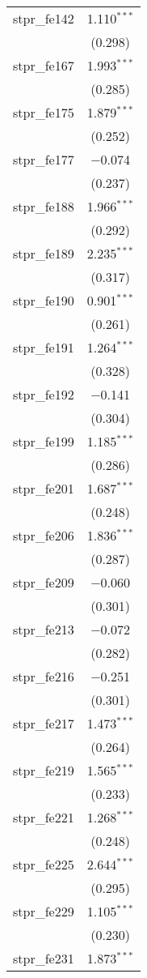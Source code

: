 \begin{table}[!htbp]
\begin{tabular}{@{\extracolsep{5pt}}lc}
  stpr\_fe142 & 1.110$^{***}$ \\ 
  & (0.298) \\ 
  stpr\_fe167 & 1.993$^{***}$ \\ 
  & (0.285) \\ 
  stpr\_fe175 & 1.879$^{***}$ \\ 
  & (0.252) \\ 
  stpr\_fe177 & $-$0.074 \\ 
  & (0.237) \\ 
  stpr\_fe188 & 1.966$^{***}$ \\ 
  & (0.292) \\ 
  stpr\_fe189 & 2.235$^{***}$ \\ 
  & (0.317) \\ 
  stpr\_fe190 & 0.901$^{***}$ \\ 
  & (0.261) \\ 
  stpr\_fe191 & 1.264$^{***}$ \\ 
  & (0.328) \\ 
  stpr\_fe192 & $-$0.141 \\ 
  & (0.304) \\ 
  stpr\_fe199 & 1.185$^{***}$ \\ 
  & (0.286) \\ 
  stpr\_fe201 & 1.687$^{***}$ \\ 
  & (0.248) \\ 
  stpr\_fe206 & 1.836$^{***}$ \\ 
  & (0.287) \\ 
  stpr\_fe209 & $-$0.060 \\ 
  & (0.301) \\ 
  stpr\_fe213 & $-$0.072 \\ 
  & (0.282) \\ 
  stpr\_fe216 & $-$0.251 \\ 
  & (0.301) \\ 
  stpr\_fe217 & 1.473$^{***}$ \\ 
  & (0.264) \\ 
  stpr\_fe219 & 1.565$^{***}$ \\ 
  & (0.233) \\ 
  stpr\_fe221 & 1.268$^{***}$ \\ 
  & (0.248) \\ 
  stpr\_fe225 & 2.644$^{***}$ \\ 
  & (0.295) \\ 
  stpr\_fe229 & 1.105$^{***}$ \\ 
  & (0.230) \\ 
  stpr\_fe231 & 1.873$^{***}$ \\ 

\end{tabular}
\end{table}
